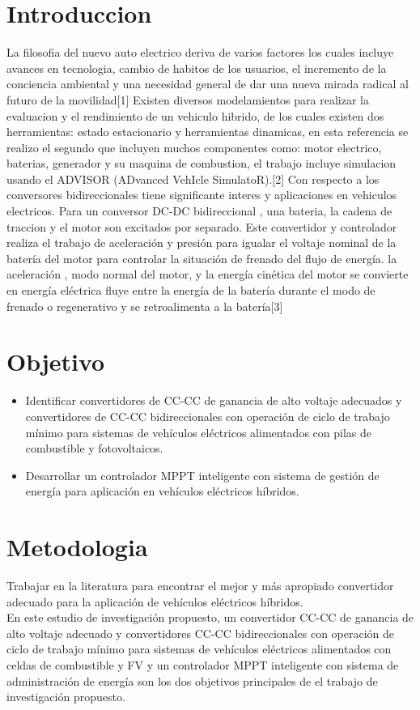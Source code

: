 \documentclass[12pt]{article}
\begin{document}
\section{Introduccion}
La filosofia del nuevo auto electrico deriva de varios factores los cuales incluye avances en tecnologia, cambio de habitos de los usuarios, el incremento de la conciencia ambiental y una necesidad general de dar una nueva mirada radical al futuro de la movilidad[1]
Existen diversos modelamientos para realizar la evaluacion y el rendimiento de un vehiculo hibrido, de los cuales existen dos herramientas: estado estacionario y herramientas dinamicas, en esta referencia se realizo el segundo que incluyen muchos componentes como: motor electrico, baterias, generador y su maquina de combustion, el trabajo incluye simulacion usando el ADVISOR (ADvanced VehIcle SimulatoR).[2]
Con respecto a los conversores bidireccionales tiene significante interes y aplicaciones en vehiculos electricos. Para un conversor DC-DC bidireccional , una bateria, la cadena de traccion y el motor son excitados por separado. Este convertidor y controlador realiza el trabajo de aceleración y presión para igualar el voltaje nominal de la batería del motor para controlar la situación de frenado del flujo de energía.
la aceleración , modo normal del motor, y la energía cinética del motor se convierte en energía eléctrica fluye entre la energía de la batería durante el modo de frenado o regenerativo y se retroalimenta a la batería[3]






\section{Objetivo}
\begin{itemize}
	\item Identificar convertidores de CC-CC de ganancia de alto voltaje adecuados y convertidores de CC-CC bidireccionales con operación de ciclo de trabajo mínimo para sistemas de vehículos eléctricos alimentados con pilas de combustible y fotovoltaicos.
	\item Desarrollar un controlador MPPT inteligente con sistema de gestión de energía para aplicación en vehículos eléctricos híbridos.
\end{itemize}




\section{Metodologia}
Trabajar en la literatura para encontrar el mejor y más apropiado convertidor adecuado para la aplicación de vehículos eléctricos híbridos. \\ En este estudio de investigación propuesto, un convertidor CC-CC de ganancia de alto voltaje adecuado y convertidores CC-CC bidireccionales con operación de ciclo de trabajo mínimo para sistemas de vehículos eléctricos alimentados con celdas de combustible y FV y un controlador MPPT inteligente con sistema de administración de energía son los dos objetivos principales de el trabajo de investigación propuesto.
\end{document}
